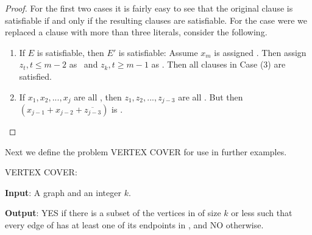 \begin{example}
\begin{proof}
For the first two cases it is fairly easy to see that the original
clause is satisfiable if and only if the resulting clauses are
satisfiable.
For the case were we replaced a clause with more than three literals,
consider the following.

\begin{enumerate}
\item If \(E\) is satisfiable, then \(E'\) is satisfiable:
Assume \(x_m\) is assigned \TRUE.
Then assign \(z_t, t\leq m-2\) as \TRUE\ and \(z_k, t \geq m-1\)
as \FALSE.
Then all clauses in Case (3) are satisfied.

\item If \(x_1, x_2, ..., x_j\) are all \FALSE, then \(z_1, z_2, ...,
z_{j-3}\) are all \TRUE.
But then \((x_{j-1} + x_{j-2} + \overline{z_{j-3}})\) is \FALSE.
\end{enumerate}
\end{proof}
\end{example}

Next we define the problem VERTEX COVER for use in further examples.

\begin{inbox}
\noindent VERTEX COVER:

\textbf{Input}: A graph  and an integer \(k\).

\textbf{Output}: YES if there is a subset  of the vertices in
 of size \(k\) or less such that every edge of 
has at least one of its endpoints in , and NO otherwise.
\end{inbox}

